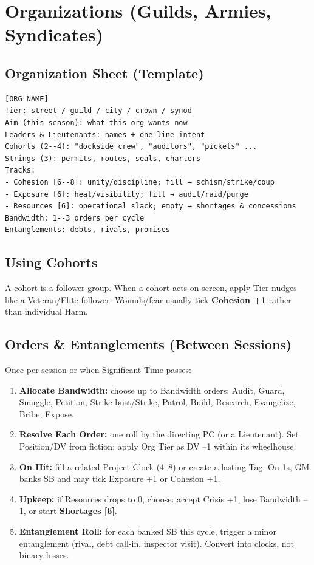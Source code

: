 \section{Organizations (Guilds, Armies, Syndicates)}
\subsection{Organization Sheet (Template)}
\begin{verbatim}
[ORG NAME]
Tier: street / guild / city / crown / synod
Aim (this season): what this org wants now
Leaders & Lieutenants: names + one-line intent
Cohorts (2--4): "dockside crew", "auditors", "pickets" ...
Strings (3): permits, routes, seals, charters
Tracks:
- Cohesion [6--8]: unity/discipline; fill → schism/strike/coup
- Exposure [6]: heat/visibility; fill → audit/raid/purge
- Resources [6]: operational slack; empty → shortages & concessions
Bandwidth: 1--3 orders per cycle
Entanglements: debts, rivals, promises
\end{verbatim}

\subsection{Using Cohorts}
A cohort is a follower group. When a cohort acts on-screen, apply Tier nudges like a Veteran/Elite follower. Wounds/fear usually tick \textbf{Cohesion +1} rather than individual Harm.

\subsection{Orders \& Entanglements (Between Sessions)}
Once per session or when Significant Time passes:
\begin{enumerate}
  \item \textbf{Allocate Bandwidth:} choose up to Bandwidth orders: Audit, Guard, Smuggle, Petition, Strike-bust/Strike, Patrol, Build, Research, Evangelize, Bribe, Expose.
  \item \textbf{Resolve Each Order:} one roll by the directing PC (or a Lieutenant). Set Position/DV from fiction; apply Org Tier as DV --1 within its wheelhouse.
  \item \textbf{On Hit:} fill a related Project Clock (4--8) or create a lasting Tag. On 1s, GM banks SB and may tick Exposure +1 or Cohesion +1.
  \item \textbf{Upkeep:} if Resources drops to 0, choose: accept Crisis +1, lose Bandwidth --1, or start \textbf{Shortages [6]}.
  \item \textbf{Entanglement Roll:} for each banked SB this cycle, trigger a minor entanglement (rival, debt call-in, inspector visit). Convert into clocks, not binary losses.
\end{enumerate}

